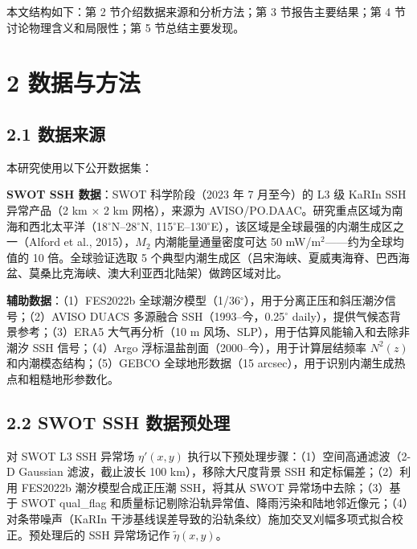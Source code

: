 \documentclass[11pt,a4paper]{article}
\begin{document}
本文结构如下：第 2 节介绍数据来源和分析方法；第 3 节报告主要结果；第 4 节讨论物理含义和局限性；第 5 节总结主要发现。\par

\section*{2  数据与方法}

\subsection*{2.1  数据来源}

本研究使用以下公开数据集：

\textbf{SWOT SSH 数据}：SWOT 科学阶段（2023 年 7 月至今）的 L3 级 KaRIn SSH 异常产品（2 km $\times$ 2 km 网格），来源为 AVISO/PO.DAAC。研究重点区域为南海和西北太平洋（18$^\circ$N--28$^\circ$N, 115$^\circ$E--130$^\circ$E），该区域是全球最强的内潮生成区之一（Alford et al., 2015），$M_2$ 内潮能量通量密度可达 50 mW/m$^2$——约为全球均值的 10 倍。全球验证选取 5 个典型内潮生成区（吕宋海峡、夏威夷海脊、巴西海盆、莫桑比克海峡、澳大利亚西北陆架）做跨区域对比。\par

\textbf{辅助数据}：（1）FES2022b 全球潮汐模型（1/36$^\circ$），用于分离正压和斜压潮汐信号；（2）AVISO DUACS 多源融合 SSH（1993--今，0.25$^\circ$ daily），提供气候态背景参考；（3）ERA5 大气再分析（10 m 风场、SLP），用于估算风能输入和去除非潮汐 SSH 信号；（4）Argo 浮标温盐剖面（2000--今），用于计算层结频率 $N^2(z)$ 和内潮模态结构；（5）GEBCO 全球地形数据（15 arcsec），用于识别内潮生成热点和粗糙地形参数化。\par

\subsection*{2.2  SWOT SSH 数据预处理}

对 SWOT L3 SSH 异常场 $\eta'(x,y)$ 执行以下预处理步骤：（1）空间高通滤波（2-D Gaussian 滤波，截止波长 100 km），移除大尺度背景 SSH 和定标偏差；（2）利用 FES2022b 潮汐模型合成正压潮 SSH，将其从 SWOT 异常场中去除；（3）基于 SWOT qual\_flag 和质量标记剔除沿轨异常值、降雨污染和陆地邻近像元；（4）对条带噪声（KaRIn 干涉基线误差导致的沿轨条纹）施加交叉刈幅多项式拟合校正。预处理后的 SSH 异常场记作 $\tilde{\eta}(x,y)$。\par
\end{document}
